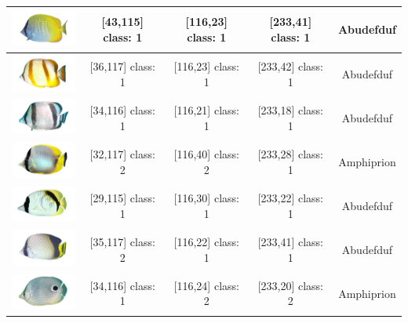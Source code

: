 \begin{longtable}{|c|c|c|c|c|}
	\includegraphics[width=3cm]{gambar/dataset_validasi/Chaetodon17} & [43,115] class: 1 & [116,23] class: 1 & [233,41] class: 1 & Abudefduf \\ \hline
	\includegraphics[width=3cm]{gambar/dataset_validasi/Chaetodon18} & [36,117] class: 1 & [116,23] class: 1 & [233,42] class: 1 & Abudefduf \\ \hline
	\includegraphics[width=3cm]{gambar/dataset_validasi/Chaetodon19} & [34,116] class: 1 & [116,21] class: 1 & [233,18] class: 1 & Abudefduf \\ \hline
	\includegraphics[width=3cm]{gambar/dataset_validasi/Chaetodon20} & [32,117] class: 2 & [116,40] class: 2 & [233,28] class: 1 & Amphiprion \\ \hline
	\includegraphics[width=3cm]{gambar/dataset_validasi/Chaetodon21} & [29,115] class: 1 & [116,30] class: 1 & [233,22] class: 1 & Abudefduf \\ \hline
	\includegraphics[width=3cm]{gambar/dataset_validasi/Chaetodon22} & [35,117] class: 2 & [116,22] class: 1 & [233,41] class: 1 & Abudefduf \\ \hline
	\includegraphics[width=3cm]{gambar/dataset_validasi/Chaetodon23} & [34,116] class: 1 & [116,24] class: 2 & [233,20] class: 2 & Amphiprion \\ \hline

\end{longtable}
